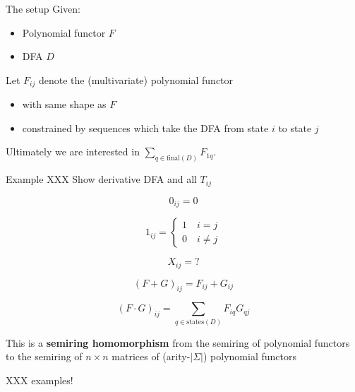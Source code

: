 \documentclass[xcolor=svgnames,12pt]{beamer}
\newenvironment{xframe}[1][]
  {\begin{frame}[fragile,environment=xframe,#1]}
  {\end{frame}}
\renewcommand{\emph}{\textbf}
\begin{document}
\begin{xframe}{The setup}
  Given:
  \begin{itemize}
  \item Polynomial functor $F$
  \item DFA $D$
  \end{itemize} \medskip

  Let $F_{ij}$ denote the (multivariate) polynomial functor
  \begin{itemize}
    \item with same shape as $F$
    \item constrained by sequences which take the DFA from state $i$
      to state $j$
  \end{itemize} \medskip

  Ultimately we are interested in $\sum_{q \in \mathrm{final}(D)} F_{1q}$.
\end{xframe}

\begin{xframe}{Example}
  XXX Show derivative DFA and all $T_{ij}$
\end{xframe}

\begin{xframe}
  \[ 0_{ij} = 0 \]
\end{xframe}

\begin{xframe}
  \[ 1_{ij} = \begin{cases} 1 \quad i = j \\ 0 \quad i \neq
    j \end{cases} \]
\end{xframe}

\begin{xframe}
  \[ X_{ij} = ? \]
\end{xframe}

\begin{xframe}
  \[ (F + G)_{ij} = F_{ij} + G_{ij} \]
\end{xframe}

\begin{xframe}
  \[ (F \cdot G)_{ij} = \sum_{q \in \mathrm{states}(D)} F_{iq} G_{qj} \]
\end{xframe}

\begin{xframe}
  This is a \emph{semiring homomorphism} from the semiring of
  polynomial functors to the semiring of $n \times n$ matrices of
  (arity-$|\Sigma|$) polynomial functors
\end{xframe}

\begin{xframe}
  XXX examples!
\end{xframe}
\end{document}
